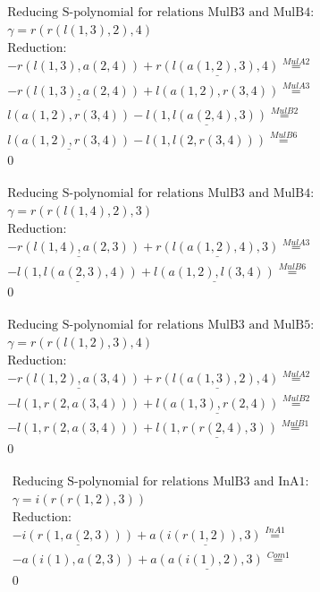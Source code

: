 \documentclass[11pt]{amsart}
\begin{document}
\begin{align*} 
& \text{Reducing S-polynomial for relations MulB3 and MulB4:} \\ 
& \gamma = r(r(l(1,3),2),4) \\ 
& \text{Reduction}: \\& - r(l(1,3),a(2,4)) + \underline{r(l(a(1,2),3),4)} \stackrel{ MulA2 }{=}  \\ 
& - \underline{r(l(1,3),a(2,4))} + l(a(1,2),r(3,4)) \stackrel{ MulA3 }{=}  \\ 
&l(a(1,2),r(3,4)) - \underline{l(1,l(a(2,4),3))} \stackrel{ MulB2 }{=}  \\ 
&\underline{l(a(1,2),r(3,4))} - l(1,l(2,r(3,4))) \stackrel{ MulB6 }{=}  \\ 
&0\\ 
\end{align*} 
 
\begin{align*} 
& \text{Reducing S-polynomial for relations MulB3 and MulB4:} \\ 
& \gamma = r(r(l(1,4),2),3) \\ 
& \text{Reduction}: \\& - \underline{r(l(1,4),a(2,3))} + \underline{r(l(a(1,2),4),3)} \stackrel{ MulA3 }{=}  \\ 
& - \underline{l(1,l(a(2,3),4))} + \underline{l(a(1,2),l(3,4))} \stackrel{ MulB6 }{=}  \\ 
&0\\ 
\end{align*} 
 
\begin{align*} 
& \text{Reducing S-polynomial for relations MulB3 and MulB5:} \\ 
& \gamma = r(r(l(1,2),3),4) \\ 
& \text{Reduction}: \\& - \underline{r(l(1,2),a(3,4))} + \underline{r(l(a(1,3),2),4)} \stackrel{ MulA2 }{=}  \\ 
& - l(1,r(2,a(3,4))) + \underline{l(a(1,3),r(2,4))} \stackrel{ MulB2 }{=}  \\ 
& - l(1,r(2,a(3,4))) + \underline{l(1,r(r(2,4),3))} \stackrel{ MulB1 }{=}  \\ 
&0\\ 
\end{align*} 
 
\begin{align*} 
& \text{Reducing S-polynomial for relations MulB3 and InA1:} \\ 
& \gamma = i(r(r(1,2),3)) \\ 
& \text{Reduction}: \\& - \underline{i(r(1,a(2,3)))} + \underline{a(i(r(1,2)),3)} \stackrel{ InA1 }{=}  \\ 
& - a(i(1),a(2,3)) + \underline{a(a(i(1),2),3)} \stackrel{ Com1 }{=}  \\ 
&0\\ 
\end{align*} 
 
\end{document}
